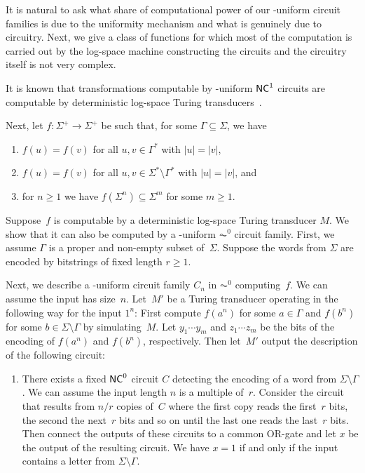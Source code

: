 \begin{remark} \label{prelim:ex:uniformity}
	It is natural to ask what share of computational
	power of our \LOGSPACE-uniform circuit families is due to the uniformity mechanism
	and what is genuinely due to circuitry.
	Next, we give a class of functions for which most of the computation
	is carried out by the log-space machine constructing the circuits
	and the circuitry itself is not very complex.	
	
	It is known that transformations computable by \LOGSPACE-uniform $\textup{\textsf{NC}}^1$ circuits
	are computable by deterministic log-space Turing transducers~\cite{DBLP:journals/siamcomp/Borodin77}.
	
	Next, let $f \colon \Sigma^+ \to \Sigma^+$
	be such that, for some $\Gamma \subseteq \Sigma$,
	we have
	\begin{enumerate}
		\item $f(u) = f(v)$ for all $u,v \in \Gamma^*$ with $|u| = |v|$, 	
		
		\item $f(u) = f(v)$ for all $u,v \in \Sigma^* \setminus \Gamma^*$ with $|u| = |v|$, and
		
		\item for $n \ge 1$ we have $f(\Sigma^n) \subseteq \Sigma^m$ for some $m \ge 1$.  
	\end{enumerate}
	Suppose~$f$ is computable by a deterministic log-space Turing transducer $M$.
	We show that it can also be computed by a \LOGSPACE-uniform $\AC^0$ circuit family.
	First, we assume $\Gamma$ is a proper and non-empty subset of~$\Sigma$.
	Suppose the words from $\Sigma$ are encoded by bitstrings of fixed length $r \ge 1$.
	
	Next, we describe a \LOGSPACE-uniform circuit family $C_n$ in $\AC^0$ computing~$f$. 
	We can assume the input has size~$n$.
	Let~$M'$ be a Turing transducer operating in the following way 
	for the input $1^n$: First compute $f(a^n)$ for some $a \in \Gamma$
	and $f(b^n)$ for some $b \in \Sigma \setminus \Gamma$ by simulating~$M$.
	Let $y_1 \cdots y_m$ and $z_1 \cdots z_m$ be the bits of the encoding of $f(a^n)$
	and $f(b^n)$, respectively.
	Then let~$M'$ output the description of the following circuit:
	
	\begin{enumerate}
		\item There exists a fixed $\textup{\textsf{NC}}^0$ circuit $C$ detecting the encoding of a word
		from $\Sigma \setminus \Gamma$.
		We can assume the input length $n$ is a multiple of~$r$.
		Consider the circuit that results from $n/r$ copies of~$C$
		where the first copy reads the first~$r$ bits, the second the next~$r$
		bits and so on until the last one reads the last~$r$ bits.
		Then connect the outputs of these circuits
		to a common {\sc OR}-gate and let $x$ be the output
		of the resulting circuit.
		We have $x = 1$ if and only if the input contains a letter from $\Sigma \setminus \Gamma$.
		

\end{enumerate}
\end{remark}
